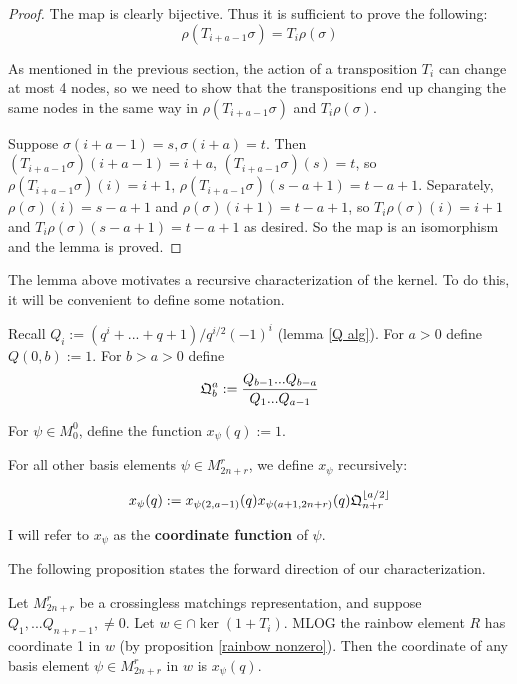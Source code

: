 \documentclass{amsart}
\begin{document}
 \begin{proof}
 	
 	The map is clearly bijective. Thus it is sufficient to prove the following: $$\rho(T_{i+a-1}\sigma)=T_i\rho(\sigma)$$
 	
 	As mentioned in the previous section, the action of a transposition $T_i$ can change at most 4 nodes, so we need to show that the transpositions end up changing the same nodes in the same way in  $\rho(T_{i+a-1}\sigma)$ and $T_i\rho(\sigma)$.
 	
 	Suppose $\sigma(i+a-1)=s,\sigma(i+a)=t$. Then $(T_{i+a-1}\sigma)(i+a-1)=i+a$, $(T_{i+a-1}\sigma)(s)=t$, so $\rho(T_{i+a-1}\sigma)(i)=i+1$, $\rho(T_{i+a-1}\sigma)(s-a+1)=t-a+1$. Separately, $\rho(\sigma)(i)=s-a+1$ and $\rho(\sigma)(i+1)=t-a+1$, so $T_i\rho(\sigma)(i)=i+1$ and $T_i\rho(\sigma)(s-a+1)=t-a+1$ as desired. So the map is an isomorphism and the lemma is proved.
 \end{proof}
 
 \vspace{5mm}
 The lemma above motivates a recursive characterization of the kernel. To do this, it will be convenient to define some notation.
 
 \begin{definition}
 	Recall $Q_i:=(q^i+...+q+1)/q^{i/2}(-1)^i$ (lemma \ref{Q alg}). For $a>0$ define $Q(0,b):=1$. For $b>a>0$ define $$\mathfrak{Q}_b^a:=\frac{Q_{b-1}...Q_{b-a}}{Q_1...Q_{a-1}}$$
 	
 \end{definition}
 
 \begin{definition}
 	For $\psi \in M_0^0$, define the function $x_\psi(q):=1$.
 	
 	For all other basis elements $\psi\in M_{2n+r}^r$, we define $x_\psi$ recursively:
 	
 	$$x_\psi(q):=x_{\psi(2,a-1)}(q)x_{\psi(a+1,2n+r)}(q)\mathfrak{Q}^{\lfloor a/2\rfloor}_{n+r}$$
 	
 	I will refer to $x_\psi$ as the \textbf{coordinate function} of $\psi$.
 	
 	\label{coeff def}
 \end{definition}
 
 
 \vspace{2mm}
 The following proposition states the forward direction of our characterization.
 \begin{proposition}
 	
 	Let $M_{2n+r}^r$ be a crossingless matchings representation, and suppose $Q_1,...Q_{n+r-1},\not=0$. Let $w\in\cap\ker(1+T_i)$. MLOG the rainbow element $R$ has coordinate 1 in $w$ (by proposition \ref{rainbow nonzero}). Then the coordinate of any basis element $\psi\in M_{2n+r}^r$ in $w$ is $x_{\psi}(q)$.
 	
 	\label{kernel characterization}
 	
 \end{proposition}
 
\end{document}

